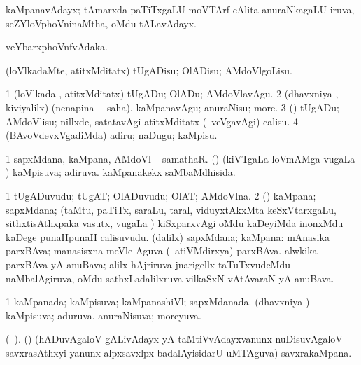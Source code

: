 {{{{{\bentry
{} 
\gl{\nA}
\expl{}
\bmng
 kaMpanavAdayx; tAmarxda paTiTxgaLU moVTArf cAlita anuraNkagaLU iruva, seZYloVphoVninaMtha, oMdu tALavAdayx. 
\emng
\eentry

\bentry
{} 
\gl{\nA}
\expl{}
\bmng
veYbarxphoVnfvAdaka. 
\emng
\eentry

\bentry
{} 
\gl{\sakirx}
\expl{}
\bmng
 (loVlkadaMte, atitxMditatx) tUgADisu; OlADisu; AMdoVlgoLisu. 
\emng

\noindent
\gl{\akirx}
\expl{}
\bmng
\bnum
\num{1} (loVlkada \vi, atitxMditatx) tUgADu; OlADu; AMdoVlavAgu. 
\num{2} (dhavxniya \vi, kiviyalilx) (nenapina \vi\ \rUpa\ saha). kaMpanavAgu; anuraNisu; more. 
\num{3} (\Bwvi) tUgADu; AMdoVlisu; nillxde, satatavAgi atitxMditatx (\kanmu\ veVgavAgi) calisu. 
\num{4} (BAvoVdevxVgadiMda) adiru; naDugu; kaMpisu. 
\enum
\emng
\eentry

\bentry
{} 
\gl{\gu}
\expl{}
\bmng
\bnum
\num{1} sapxMdana, kaMpana, AMdoVl -- samathaR. 
 (\jiVvi) 
\banum
{} (kiVTgaLa loVmAMga \mo vugaLa \vi) kaMpisuva; adiruva. 
 kaMpanakekx saMbaMdhisida. 
\eanum
\numie
\enum
\emng
\eentry

\bentry
{} 
\gl{\nA}
\expl{}
\bmng
\bnum
\num{1} tUgADuvudu; tUgAT; OlADuvudu; OlAT; AMdoVlna. 
\num{2} (\Bwvi) kaMpana; sapxMdana; (taMtu, paTiTx, saraLu, taral, viduyxtAkxMta keSxVtarxgaLu, sithxtisAthxpaka vasutx, \mo vugaLa \vi) kiSxparxvAgi oMdu kaDeyiMda inonxMdu kaDege punaHpunaH calisuvudu. 
 (\bava dalilx) sapxMdana; kaMpana: 
\banum
{} mAnasika parxBAva; manasisxna meVle Aguva (\kanmu\ atiVMdirxya) parxBAva. 
 alwkika parxBAva yA anuBava; alilx hAjriruva jnarigellx taTuTxvudeMdu naMbalAgiruva, oMdu sathxLadalilxruva vilkaSxN vAtAvaraN yA anuBava. 
\eanum
\numie
\enum
\emng
\eentry

\bentry
{} 
\gl{\gu}
\expl{}
\bmng
\emng
\eentry

\bentry
{} 
\gl{\gu}
\expl{}
\bmng
\bnum
\num{1} kaMpanada; kaMpisuva; kaMpanashiVl; sapxMdanada. 
 (dhavxniya \vi) 
\banum
{} kaMpisuva; aduruva. 
 anuraNisuva; moreyuva. 
\eanum
\numie
\enum
\emng
\eentry

\bentry
{} 
\gl{\nA}(\bava\ ). 
\bmng
 (\saM) (hADuvAgaloV gALivAdayx yA taMtiVvAdayxvanunx nuDisuvAgaloV savxrasAthxyi yanunx alpxsavxlpx badalAyisidarU uMTAguva) savxrakaMpana. 
\emng
\eentry

}}}}}
